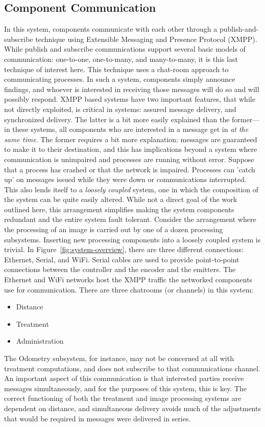 \documentclass[12pt]{article}
\begin{document}
{\subsection{Component Communication} 
In this system, components communicate with each other through a publish-and-subscribe technique using Extensible Messaging and Presence Protocol (XMPP). While publish and subscribe communications support several basic models of communication: one-to-one, one-to-many, and many-to-many, it is this last technique of interest here. This technique uses a chat-room approach to communicating processes. In such a system, components simply announce findings, and whoever is interested in receiving those messages will do so and will possibly respond.  XMPP based systems have two important features, that while not directly exploited, is critical in systems: assured message delivery, and synchronized delivery. The latter is a bit more easily explained than the former---in these systems, all components who are interested in a message get in \textit{at the same time}. The former requires a bit more explanation: messages are guaranteed to make it to their destination, and this has implications beyond a system where communication is unimpaired and processes are running without error. Suppose that a process has crashed or that the network is impaired. Processes can 'catch up' on messages issued while they were down or communications interrupted. \\
This also  lends itself to a \textit{loosely coupled} system, one in which the composition of the system can be quite easily altered. While not a direct goal of the work outlined here, this arrangement simplifies making the system components redundant and the entire system fault tolerant. Consider the arrangement where the processing of an image is carried out by one of a dozen processing subsystems. Inserting new processing components into a loosely coupled system is trivial.
In Figure~\ref{fig:system-overview}, there are three different connections: Ethernet, Serial, and WiFi. Serial cables are used to provide point-to-point connections between the controller and the encoder and the emitters. The Ethernet and WiFi networks host the XMPP traffic the networked components use for communication. There are three chatrooms (or channels) in this system:
\begin{itemize}
	\item{Distance}
	\item{Treatment}
	\item{Administration}
\end{itemize}
The Odometry subsystem, for instance, may not be concerned at all with treatment computations, and does not subscribe to that communications channel. An important aspect of this communication is that interested parties receive messages simultaneously, and for the purposes of this system, this is key. The correct functioning of both the treatment and image processing systems are dependent on distance, and simultaneous delivery avoids much of the adjustments that would be required in messages were delivered in series.

}
\end{document}
